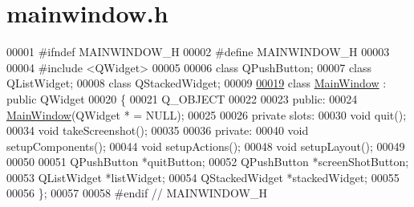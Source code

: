 \hypertarget{mainwindow_8h_source}{}\section{mainwindow.\+h}
\label{mainwindow_8h_source}

\begin{DoxyCode}
00001 \textcolor{preprocessor}{#ifndef MAINWINDOW\_H}
00002 \textcolor{preprocessor}{#define MAINWINDOW\_H}
00003 
00004 \textcolor{preprocessor}{#include <QWidget>}
00005 
00006 \textcolor{keyword}{class }QPushButton;
00007 \textcolor{keyword}{class }QListWidget;
00008 \textcolor{keyword}{class }QStackedWidget;
00009 
\hypertarget{mainwindow_8h_source.tex_l00019}{}\hyperlink{classMainWindow}{00019} \textcolor{keyword}{class }\hyperlink{classMainWindow}{MainWindow} : \textcolor{keyword}{public} QWidget
00020 \{
00021     Q\_OBJECT
00022 
00023 \textcolor{keyword}{public}:
00024     \hyperlink{classMainWindow_a25e1fb1c2c42a5b961db39ae08ff6443}{MainWindow}(QWidget * = NULL);
00025 
00026 \textcolor{keyword}{private} slots:
00030     \textcolor{keywordtype}{void} quit();
00034     \textcolor{keywordtype}{void} takeScreenshot();
00035 
00036 \textcolor{keyword}{private}:
00040     \textcolor{keywordtype}{void} setupComponents();
00044     \textcolor{keywordtype}{void} setupActions();
00048     \textcolor{keywordtype}{void} setupLayout();
00049 
00050 
00051     QPushButton *quitButton;
00052     QPushButton *screenShotButton;
00053     QListWidget *listWidget;
00054     QStackedWidget *stackedWidget;
00055 
00056 \};
00057 
00058 \textcolor{preprocessor}{#endif // MAINWINDOW\_H}
\end{DoxyCode}
